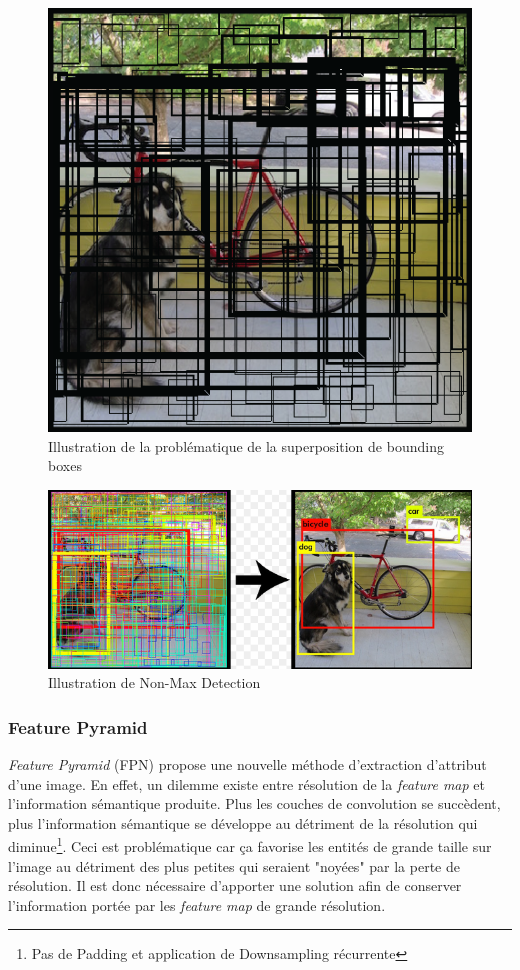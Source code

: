\begin{figure}
    \centering
    \includegraphics[scale=0.3]{./tex/computer-vision/object-recognition/nonmax.png}
    \caption{Illustration de la problématique de la superposition de bounding boxes}
    \label{nonmaxdetec}
\end{figure}

\begin{figure}
    \centering
    \includegraphics[scale=0.4]{./tex/computer-vision/object-recognition/nonmax2.png}
    \caption{Illustration de Non-Max Detection}
    \label{nonmaxdetec2}
\end{figure}

\subsubsection{Feature Pyramid}
\label{fepyramide}
\textit{Feature Pyramid}\cite{featurepyramide} (FPN) propose une nouvelle méthode d'extraction d'attribut d'une image. En effet, un dilemme existe entre résolution de la \textit{feature map} et l'information sémantique produite. Plus les couches de convolution se succèdent, plus l'information sémantique se développe au détriment de la résolution qui diminue\footnote{Pas de Padding et application de Downsampling récurrente}. Ceci est problématique car ça favorise les entités de grande taille sur l'image au détriment des plus petites qui seraient "noyées" par la perte de résolution. Il est donc nécessaire d'apporter une solution afin de conserver l'information portée par les \textit{feature map} de grande résolution. \\


